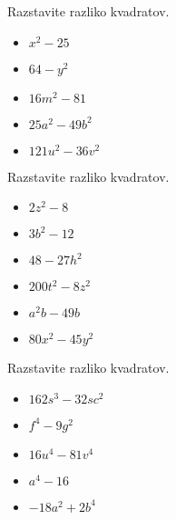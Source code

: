     
    \begin{multicols}{2}
        
        
            \begin{naloga}
                Razstavite razliko kvadratov.
                \begin{itemize}
                    \item $x^2-25$ 
                    \item $64-y^2$ 
                    \item $16m^2-81$ 
                    \item $25a^2-49b^2$ 
                    \item $121u^2-36v^2$ 
                \end{itemize}
            \end{naloga}
        
    
        
            \begin{naloga}
                Razstavite razliko kvadratov.
                \begin{itemize}
                    \item $2z^2-8$ 
                    \item $3b^2-12$ 
                    \item $48-27h^2$ 
                    \item $200t^2-8z^2$ 
                    \item $a^2b-49b$ 
                    \item $80x^2-45y^2$ 
                \end{itemize}
            \end{naloga}
        
    
        
            \begin{naloga}
                Razstavite razliko kvadratov.
                \begin{itemize}
                    \item $162s^3-32sc^2$ 
                    \item $f^4-9g^2$ 
                    \item $16u^4-81v^4$ 
                    \item $a^4-16$ 
                    \item $-18a^2+2b^4$ 
                \end{itemize}
            \end{naloga}
        

\end{multicols}

